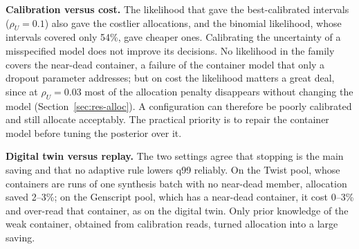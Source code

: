 \documentclass[conference,onecolumn,11pt]{IEEEtran}
\begin{document}
\textbf{Calibration versus cost.}  The likelihood that gave the best-calibrated intervals
($\rho_U{=}0.1$) also gave the costlier allocations, and the binomial likelihood, whose intervals covered
only 54\%, gave cheaper ones.  Calibrating the uncertainty of a misspecified model does not improve its
decisions.  No likelihood in the family covers the near-dead container, a failure of the container model
that only a dropout parameter addresses; but on cost the likelihood matters a great deal, since at
$\rho_U{=}0.03$ most of the allocation penalty disappears without changing the model
(Section~\ref{sec:res-alloc}).  A configuration can therefore be poorly calibrated and still allocate
acceptably.  The practical priority is to repair the container model before tuning the posterior over it.

\textbf{Digital twin versus replay.}  The two settings agree that stopping is the main saving and that
no adaptive rule lowers q99 reliably.  On the Twist pool, whose containers are runs of one synthesis
batch with no near-dead member, allocation saved 2--3\%; on the Genscript pool, which has a near-dead
container, it cost 0--3\% and over-read that container, as on the digital twin.  Only prior knowledge of
the weak container, obtained from calibration reads, turned allocation into a large saving.
\end{document}
